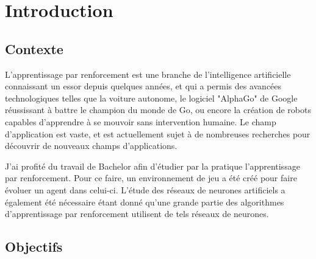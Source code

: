 \documentclass[11pt,a4paper]{report}
\title{\vartitle}
\author{\varauthor}
\date{\vardate}
\begin{document}
  \begin{titlepage}
    \maketitle

    \thispagestyle{empty}

    \begin{abstract}
    // TODO
    \end{abstract}


  \end{titlepage}
  
  \newpage
  
  \tableofcontents
  
  \newpage

  \chapter{Introduction}
  
  \section{Contexte}
  
  \par L'apprentissage par renforcement est une branche de l'intelligence artificielle connaissant un essor depuis quelques années, et qui a permis des avancées technologiques telles que la voiture autonome, le logiciel "AlphaGo" de Google réussissant à battre le champion du monde de Go, ou encore la création de robots capables d'apprendre à se mouvoir sans intervention humaine. Le champ d'application est vaste, et est actuellement sujet à de nombreuses recherches pour découvrir de nouveaux champs d'applications. 
  
  \par J'ai profité du travail de Bachelor afin d'étudier par la pratique l'apprentissage par renforcement. Pour ce faire, un environnement de jeu a été créé pour faire évoluer un agent dans celui-ci. L'étude des réseaux de neurones artificiels a également été nécessaire étant donné qu'une grande partie des algorithmes d'apprentissage par renforcement utilisent de tels réseaux de neurones. 
  
  \section{Objectifs}
  
\end{document}
